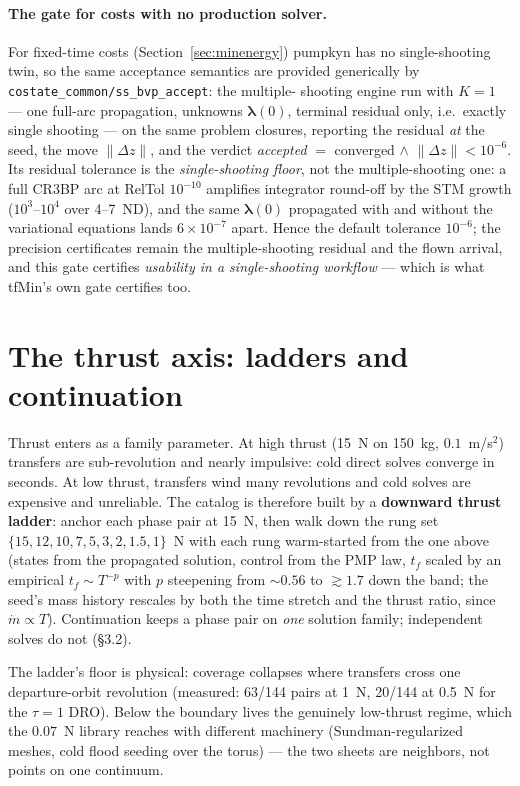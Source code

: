 \documentclass[11pt]{article}
\begin{document}
\paragraph{The gate for costs with no production solver.}
\label{sec:accept}
For fixed-time costs (Section~\ref{sec:minenergy}) pumpkyn has no
single-shooting twin, so the same acceptance semantics are provided
generically by \texttt{costate\_common/ss\_bvp\_accept}: the multiple-
shooting engine run with $K=1$ --- one full-arc propagation, unknowns
$\bm\lambda(0)$, terminal residual only, i.e.\ exactly single shooting ---
on the same problem closures, reporting the residual \emph{at} the seed, the
move $\lVert\Delta z\rVert$, and the verdict \emph{accepted} $=$ converged
$\wedge$ $\lVert\Delta z\rVert<10^{-6}$. Its residual tolerance is the
\emph{single-shooting floor}, not the multiple-shooting one: a full CR3BP
arc at RelTol $10^{-10}$ amplifies integrator round-off by the STM growth
($10^3$--$10^4$ over 4--7~ND), and the same $\bm\lambda(0)$ propagated with
and without the variational equations lands $6\times10^{-7}$ apart. Hence
the default tolerance $10^{-6}$; the precision certificates remain the
multiple-shooting residual and the flown arrival, and this gate certifies
\emph{usability in a single-shooting workflow} --- which is what tfMin's own
gate certifies too.

\section{The thrust axis: ladders and continuation}

Thrust enters as a family parameter. At high thrust (15~N on 150~kg,
$0.1$~m/s$^2$) transfers are sub-revolution and nearly impulsive: cold
direct solves converge in seconds. At low thrust, transfers wind many
revolutions and cold solves are expensive and unreliable. The catalog is
therefore built by a \textbf{downward thrust ladder}: anchor each phase
pair at 15~N, then walk down the rung set
$\{15,12,10,7,5,3,2,1.5,1\}$~N with each rung warm-started from the one
above (states from the propagated solution, control from the PMP law,
$t_f$ scaled by an empirical $t_f \sim T^{-p}$ with $p$ steepening from
$\sim0.56$ to $\gtrsim1.7$ down the band; the seed's mass history rescales
by both the time stretch and the thrust ratio, since $\dot m \propto T$).
Continuation keeps a phase pair on \emph{one} solution family; independent
solves do not (\S3.2).

The ladder's floor is physical: coverage collapses where transfers cross
one departure-orbit revolution (measured: 63/144 pairs at 1~N, 20/144 at
0.5~N for the $\tau=1$ DRO). Below the boundary lives the genuinely
low-thrust regime, which the $0.07$~N library reaches with different
machinery (Sundman-regularized meshes, cold flood seeding over the torus)
--- the two sheets are neighbors, not points on one continuum.
\end{document}
